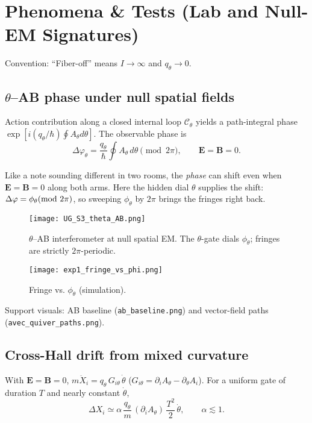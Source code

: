 \section{Phenomena \& Tests (Lab and Null-EM Signatures)}\label{sec:phenomenology}

Convention: “Fiber-off” means $I\to\infty$ and $q_\theta\to 0$.

\subsection{\texorpdfstring{$\theta$}{theta}--AB phase under null spatial fields}\label{sec:theta-ab}
Action contribution along a closed internal loop $\mathcal C_\theta$ yields a path-integral phase $\exp[i(q_\theta/\hbar)\oint A_\theta d\theta]$. The observable phase is
\begin{equation}
 \Delta\varphi_\theta = \frac{q_\theta}{\hbar}\oint A_\theta\,d\theta \pmod{2\pi},\qquad \bm E=\bm B=0.
\end{equation}

\begin{idea}
Like a note sounding different in two rooms, the \emph{phase} can shift even when $\mathbf{E}=\mathbf{B}=0$ along both arms. Here the hidden dial $\theta$ supplies the shift: $\Delta\varphi=\phi_\theta \\ (\mathrm{mod}\ 2\pi)$, so sweeping $\phi_\theta$ by $2\pi$ brings the fringes right back.
\end{idea}

\begin{figure}[h]
  \centering
  \texttt{[image: UG\_S3\_theta\_AB.png]}
  \caption{$\theta$--AB interferometer at null spatial EM. The $\theta$-gate dials $\phi_\theta$; fringes are strictly $2\pi$-periodic.}
  \label{fig:theta-ab-cartoon}
\end{figure}

\begin{figure}[h]
  \centering
  \texttt{[image: exp1\_fringe\_vs\_phi.png]}
  \caption{Fringe vs. $\phi_\theta$ (simulation).}
  \label{fig:theta-ab-fringe}
\end{figure}


Support visuals: AB baseline (\texttt{ab\_baseline.png}) and vector-field paths (\texttt{avec\_quiver\_paths.png}).

\subsection{Cross-Hall drift from mixed curvature}\label{sec:cross-hall}
With $\bm E=\bm B=0$, $m\ddot X_i = q_\theta\,G_{i\theta}\,\dot\theta$ ($G_{i\theta}=\partial_iA_\theta-\partial_\theta A_i$). For a uniform gate of duration $T$ and nearly constant $\dot\theta$,
\begin{equation}
 \Delta X_i \simeq \alpha\,\frac{q_\theta}{m}\,(\partial_iA_\theta)\,\frac{T^2}{2}\,\dot\theta,\qquad \alpha\lesssim 1.
\end{equation}

